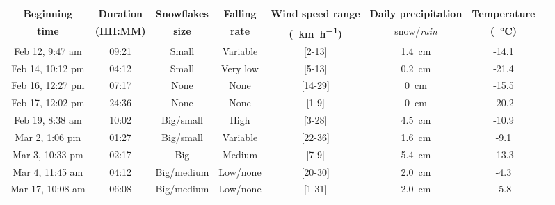 \begin{table}[htbp]
    \centering
    \\
    \begin{tabular}{|c|c|c|c|c|c|c|c|}
        \hline
        \textbf{Beginning} & \textbf{Duration} & \textbf{Snowflakes} & \textbf{Falling} & \textbf{Wind speed range}      & \textbf{Daily precipitation}  & \textbf{Temperature}     \\
        \textbf{time}      & \textbf{(HH:MM)}  & \textbf{size}       & \textbf{rate}    & \textbf{(\SI{}{\km\per\hour})} & snow/\textit{rain}            & \textbf{(\SI{}{\celsius})}      \\\hline
        Feb 12, 9:47 am    &  09:21            & Small               & Variable         & [2-13]                         & \SI{1.4}{\cm}                 & -14.1 \\\hline
        Feb 14, 10:12 pm   &  04:12            & Small               & Very low         & [5-13]                         & \SI{0.2}{\cm}                 & -21.4 \\\hline
        Feb 16, 12:27 pm   &  07:17            & None                & None             & [14-29]                        & \SI{0}{\cm}                   & -15.5 \\\hline
        Feb 17, 12:02 pm   &  24:36            & None                & None             & [1-9]                          & \SI{0}{\cm}                   & -20.2 \\\hline
        Feb 19, 8:38 am    &  10:02            & Big/small           & High             & [3-28]                         & \SI{4.5}{\cm}                 & -10.9 \\\hline
        Mar 2, 1:06 pm     &  01:27            & Big/small           & Variable         & [22-36]                        & \SI{1.6}{\cm}                 & -9.1  \\\hline
        Mar 3, 10:33 pm    &  02:17            & Big                 & Medium           & [7-9]                          & \SI{5.4}{\cm}                 & -13.3 \\\hline
        Mar 4, 11:45 am    &  04:12            & Big/medium          & Low/none         & [20-30]                        & \SI{2.0}{\cm}                 & -4.3  \\\hline
        Mar 17, 10:08 am   &  06:08            & Big/medium          & Low/none         & [1-31]                         & \SI{2.0}{\cm}                 & -5.8  \\\hline

\end{tabular}
\end{table}
